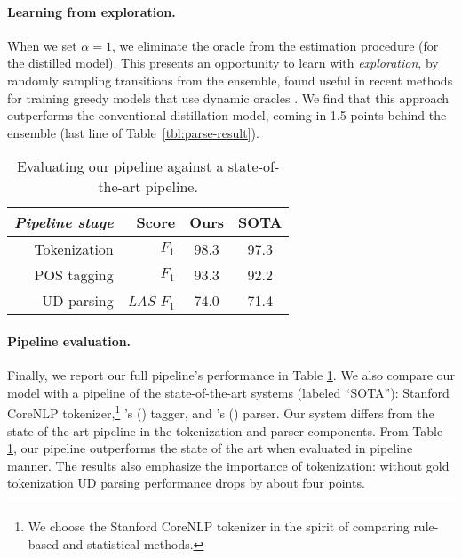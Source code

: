 \documentclass[11pt,a4paper]{article}
\newcommand{\citeposs}[2][]{\citeauthor{#2}'s (\citeyear[#1]{#2})}
\begin{document}
\paragraph{Learning from exploration.} When we set $\alpha =1$, we
eliminate the oracle from the estimation procedure (for the distilled
model).  This presents an opportunity to learn with \emph{exploration}, by
randomly sampling transitions from the ensemble, found useful
in recent methods for training greedy models that use dynamic oracles
\citep{goldberg-nivre:2012:PAPERS,TACL145,TACL885,ballesteros-EtAl:2016:EMNLP2016}.  
We find that this
approach outperforms the  conventional distillation model, coming in
1.5 points behind the ensemble (last line of Table~\ref{tbl:parse-result}).







\begin{table}[t]
	\centering
	\begin{tabular}{rrcc}
\it Pipeline stage & Score & Ours & SOTA \\
		\hline
		Tokenization  & \it $F_1$ & 98.3 & 97.3 \\		
		POS tagging &  \it  $F_1$ & 93.3 & 92.2 \\
		UD parsing & \it LAS $F_1$ & 74.0 & 71.4 \\
\end{tabular}
	\caption{Evaluating our pipeline against a state-of-the-art pipeline.\label{tbl:pipline} }
\end{table}

\paragraph{Pipeline evaluation.} Finally, we report  our full
pipeline's performance in  Table \ref{tbl:pipline}. We also compare
our model with a pipeline of the state-of-the-art systems (labeled  ``SOTA''):
Stanford CoreNLP tokenizer,\footnote{We choose the Stanford CoreNLP tokenizer in the spirit of comparing 
rule-based and statistical methods.} \citeposs{owoputi-EtAl:2013:NAACL-HLT} tagger, and \citeposs{dozat-qi-manning:2017:K17-3} parser.
Our system differs from the state-of-the-art pipeline in the tokenization and parser components.
From Table \ref{tbl:pipline}, our pipeline outperforms the state of
the art when
evaluated in pipeline manner.
The results also emphasize the
importance of tokenization:  without gold tokenization
UD parsing
performance drops by about four points.
\end{document}
